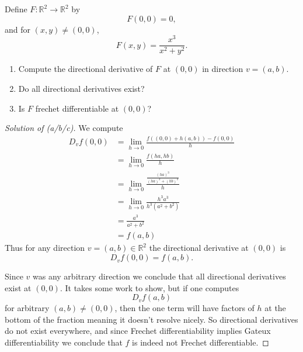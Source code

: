 \begin{prob}
    Define $F : \mathbb R^2 \to \mathbb R^2$ by 
    \[
        F(0,0) = 0, 
    \]
    and for $(x,y) \neq (0,0)$, 
    \[
        F(x,y) = \frac{x^3}{x^2 + y^2}.
    \]

    \begin{enumerate}[label=\alph*)]
        \item Compute the directional derivative of $F$ at 
            $(0,0)$ in direction $v = (a,b)$.

        \item Do all directional derivatives exist?

        \item Is $F$ frechet differentiable at $(0,0)$?
    \end{enumerate}
\end{prob}
\begin{proof}[Solution of (a/b/c)]
    We compute 
    \begin{align*}
        D_vf(0,0)
        &= \lim_{h\to0} \frac{f((0,0)+h(a,b)) - f(0,0)}{h}
        \\ 
        &= \lim_{h\to0} \frac{f(ha, hb)}{h} \\ 
        &= \lim_{h\to0} \frac{\frac{(ha)^3}{(ha)^2 + (hb)^2}}{h}
        \\ 
        &= \lim_{h\to0} \frac{h^3 a^3}{h^3(a^2 + b^2)} \\ 
        &= \frac{a^3}{a^2 + b^2} \\ 
        &= f(a,b)
    \end{align*}
    Thus for any direction $v =(a,b) \in \mathbb R^2$ the directional 
    derivative at $(0,0)$ is 
    \[
        D_vf(0,0) = f(a,b).
    \]

    Since $v$ was any arbitrary direction we conclude that 
    all directional derivatives exist at $(0,0)$.
    It takes some work to show, but if one computes 
    \[
        D_vf(a,b)
    \]
    for arbitrary $(a,b) \neq (0,0)$, then the one term 
    will have factors of $h$ at the bottom of the fraction 
    meaning it doesn't resolve nicely. 
    So directional derivatives do not exist everywhere, and 
    since Frechet differentiability implies Gateux differentiability
    we conclude that $f$ is indeed not Frechet differentiable.
\end{proof}

